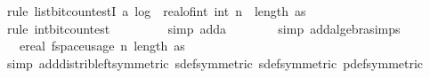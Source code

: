 \begin{isabellebody}
\ {\isacharparenleft}{\kern0pt}rule\ list{\isacharunderscore}{\kern0pt}bit{\isacharunderscore}{\kern0pt}count{\isacharunderscore}{\kern0pt}estI{\isacharbrackleft}{\kern0pt}\ a{\isacharequal}{\kern0pt}{\isachardoublequoteopen}{}{\isacharasterisk}{\kern0pt}\ log\ {}\ {\isacharparenleft}{\kern0pt}real{\isacharunderscore}{\kern0pt}of{\isacharunderscore}{\kern0pt}int\ {\isacharparenleft}{\kern0pt}int\ {\isacharparenleft}{\kern0pt}{\isacharparenleft}{\kern0pt}{}{\isacharplus}{\kern0pt}{}{\isacharasterisk}{\kern0pt}n{\isacharparenright}{\kern0pt}\ {\isacharasterisk}{\kern0pt}\ length\ as{\isacharparenright}{\kern0pt}{\isacharplus}{\kern0pt}{}{\isacharparenright}{\kern0pt}{\isacharparenright}{\kern0pt}{\isacharplus}{\kern0pt}{}{\isachardoublequoteclose}{\isacharbrackright}{\kern0pt}{\isacharparenright}{\kern0pt}\isanewline
\ \ \ \ \ \ \ \isamarkupfalse%
\ {\isacharparenleft}{\kern0pt}rule\ int{\isacharunderscore}{\kern0pt}bit{\isacharunderscore}{\kern0pt}count{\isacharunderscore}{\kern0pt}est{\isacharparenright}{\kern0pt}\isanewline
\ \ \ \ \ \ \ \isamarkupfalse%
\ {\isacharparenleft}{\kern0pt}simp\ add{\isacharcolon}{\kern0pt}a{\isacharunderscore}{\kern0pt}{}{\isacharparenright}{\kern0pt}\isanewline
\ \ \ \ \ \ \isamarkupfalse%
\ {\isacharparenleft}{\kern0pt}simp\ add{\isacharcolon}{\kern0pt}algebra{\isacharunderscore}{\kern0pt}simps{\isacharparenright}{\kern0pt}\isanewline
\ \ \ \ \isamarkupfalse%
\ \isamarkupfalse%
\ {\isachardoublequoteopen}{\isachardot}{\kern0pt}{\isachardot}{\kern0pt}{\isachardot}{\kern0pt}\ {\isacharequal}{\kern0pt}\ ereal\ {\isacharparenleft}{\kern0pt}f{}{\isacharunderscore}{\kern0pt}space{\isacharunderscore}{\kern0pt}usage\ {\isacharparenleft}{\kern0pt}n{\isacharcomma}{\kern0pt}\ length\ as{\isacharcomma}{\kern0pt}\ {\isasymepsilon}{\isacharcomma}{\kern0pt}\ {\isasymdelta}{\isacharparenright}{\kern0pt}{\isacharparenright}{\kern0pt}{\isachardoublequoteclose}\isanewline
\ \ \ \ \ \ \isamarkupfalse%
\ {\isacharparenleft}{\kern0pt}simp\ add{\isacharcolon}{\kern0pt}distrib{\isacharunderscore}{\kern0pt}left{\isacharbrackleft}{\kern0pt}symmetric{\isacharbrackright}{\kern0pt}\ sdef{\isacharbrackleft}{\kern0pt}symmetric{\isacharbrackright}{\kern0pt}\ sdef{\isacharbrackleft}{\kern0pt}symmetric{\isacharbrackright}{\kern0pt}\ p{\isacharunderscore}{\kern0pt}def{\isacharbrackleft}{\kern0pt}symmetric{\isacharbrackright}{\kern0pt}{\isacharparenright}{\kern0pt}\isanewline

\end{isabellebody}
